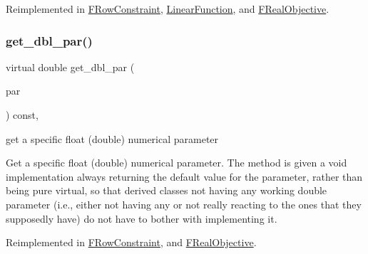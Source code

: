 Reimplemented in \mbox{\hyperlink{class_s_m_spp__di__unipi__it_1_1_f_row_constraint_af420d3dff49afbccc8a0c2de86374eeb}{F\+Row\+Constraint}}, \mbox{\hyperlink{class_s_m_spp__di__unipi__it_1_1_linear_function_a8c965c848816d9acca40c995164e5773}{Linear\+Function}}, and \mbox{\hyperlink{class_s_m_spp__di__unipi__it_1_1_f_real_objective_af420d3dff49afbccc8a0c2de86374eeb}{F\+Real\+Objective}}.

\mbox{\label{class_s_m_spp__di__unipi__it_1_1_thin_compute_interface_a16a600de08446b386bc437d8448ef44a}} 
\subsubsection{\texorpdfstring{get\+\_\+dbl\+\_\+par()}{get\_dbl\_par()}}
{\footnotesize\ttfamily virtual double get\+\_\+dbl\+\_\+par (\begin{DoxyParamCaption}\item[{const \mbox{\hyperlink{class_s_m_spp__di__unipi__it_1_1_thin_compute_interface_aa3d710629ad8c434286726ad810c3b47}{idx\+\_\+type}}}]{par }\end{DoxyParamCaption}) const\hspace{0.3cm}{\ttfamily [inline]}, {\ttfamily [virtual]}}



get a specific float (double) numerical parameter 

Get a specific float (double) numerical parameter. The method is given a void implementation always returning the default value for the parameter, rather than being pure virtual, so that derived classes not having any working double parameter (i.\+e., either not having any or not really reacting to the ones that they supposedly have) do not have to bother with implementing it. 

Reimplemented in \mbox{\hyperlink{class_s_m_spp__di__unipi__it_1_1_f_row_constraint_af7101b9f3e872b6ad9129ab99cff4cb7}{F\+Row\+Constraint}}, and \mbox{\hyperlink{class_s_m_spp__di__unipi__it_1_1_f_real_objective_af7101b9f3e872b6ad9129ab99cff4cb7}{F\+Real\+Objective}}.

